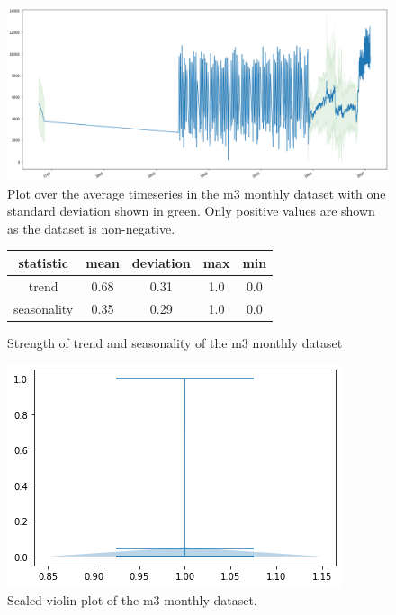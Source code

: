 \begin{figure}[htb]
    \centering
      \includegraphics[width=\linewidth]{4_designing/figures/m3_monthly_plot.png}
      \caption{Plot over the average timeseries in the m3 monthly dataset with one standard deviation shown in green. Only positive values are shown as the dataset is non-negative.}
      \label{fig:m3_monthly_plot}
    \endminipage\hfill
\end{figure}

\begin{figure}[htb]
    \centering
        \begin{center}
            \begin{tabular}{||c | c | c | c | c |} 
                \hline
                statistic & mean & deviation & max & min\\
                \hline
                trend & 0.68 & 0.31 & 1.0 & 0.0 \\
                \hline
                seasonality & 0.35 & 0.29 & 1.0 & 0.0 \\
                \hline
                \hline
            \end{tabular}
            \caption{Strength of trend and seasonality of the m3 monthly dataset}
        \end{center}
    \endminipage\hfill
      \includegraphics[width=\linewidth]{4_designing/figures/m3_monthly_violin.png}
      \caption{Scaled violin plot of the m3 monthly dataset.}
      \label{fig:m3_monthly_violin}
    \endminipage\hfill
\end{figure}

